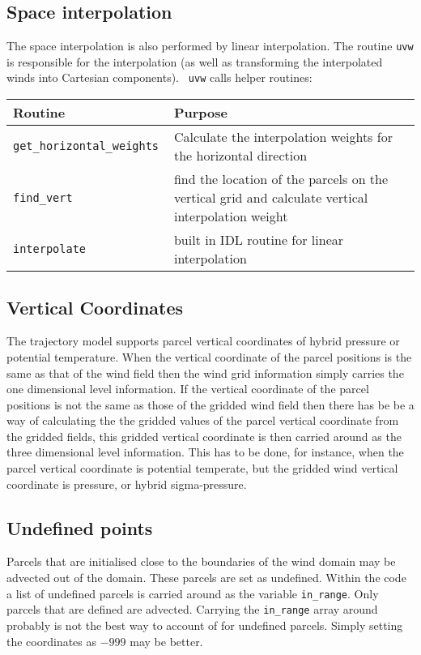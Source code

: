 \documentclass[a4paper]{article}
\begin{document}
\subsection{Space interpolation}
The space interpolation is also performed by linear interpolation.
The routine {\tt uvw} is responsible for the interpolation (as well as
transforming the interpolated winds into Cartesian components).  {\tt
  uvw} calls helper routines:

\begin{tabular}{|l|p{15pc}|}
\hline
Routine & Purpose \\
\hline
{\tt get\_horizontal\_weights } & Calculate the interpolation weights
for the horizontal direction \\
{\tt find\_vert} & find the location of the parcels on the vertical
grid and calculate vertical interpolation weight\\
{\tt interpolate} & built in IDL routine for linear interpolation\\
\hline
\end{tabular}

\subsection{Vertical Coordinates}
The trajectory model supports parcel vertical coordinates of hybrid
pressure or potential temperature.  When the vertical
coordinate of the parcel positions is the same as that of the wind
field then the wind grid information simply carries the one
dimensional level information.  If the vertical coordinate of the
parcel positions is not the same as those of the gridded wind field
then there has be be a way of calculating the the gridded values of
the parcel vertical coordinate from the gridded fields, this gridded
vertical coordinate is then carried around as the three dimensional
level information.  This has to be done, for instance, when the parcel
vertical coordinate is potential temperate, but the gridded wind
vertical coordinate is pressure, or hybrid sigma-pressure.

\subsection{Undefined points}
Parcels that are initialised close to the boundaries of the wind
domain may be advected out of the domain.  These parcels are set as
undefined.  Within the code a list of undefined parcels is carried
around as the variable {\tt in\_range}.  Only parcels that are defined
are advected.  Carrying the {\tt in\_range} array around probably is
not the best way to account of for undefined parcels.  Simply setting
the coordinates as $-999$ may be better.
\end{document}
